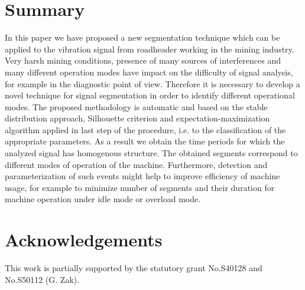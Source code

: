 \documentclass[10pt]{article}
\begin{document}
\section{Summary}

In this paper we have proposed  a new segmentation technique which can be applied to the vibration signal from roadheader working in the mining industry. Very harsh mining conditions, presence of many sources of interferences and many different operation modes have impact on the difficulty of signal analysis, for example in the diagnostic point of view. Therefore it is necessary to develop a novel technique for signal segmentation in order to identify different operational modes. The proposed methodology is automatic and  based on the stable distribution approach, Silhouette criterion and expectation-maximization algorithm applied in last step of the procedure, i.e. to the classification of the appropriate parameters. As a result we obtain the time periods for which the analyzed signal has homogenous structure. The obtained segments correspond to different  modes of operation of the machine. Furthermore, detection and parameterization of such events might help to improve efficiency of machine usage, for example to minimize number of segments and their duration for machine operation under idle mode or overload mode.

\section*{Acknowledgements}

This work is partially supported by the statutory grant No.S40128 and No.S50112 (G. Zak).

% 

\end{document}
